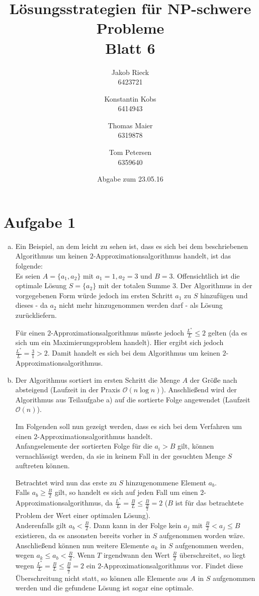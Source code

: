 \documentclass[12pt,a4paper]{article}
\title{Lösungsstrategien für NP-schwere Probleme\\Blatt 6}
\author{
		Jakob Rieck\\
		\small{6423721}
	\and
		Konstantin Kobs\\
		\small{6414943}
	\and
		Thomas Maier\\
		\small{6319878}
	\and
		Tom Petersen\\
		\small{6359640}
}
\date{Abgabe zum 23.05.16}
\begin{document}
\maketitle

\section*{Aufgabe 1}

 \begin{enumerate}[a)]

 	\item Ein Beispiel, an dem leicht zu sehen ist, dass es sich bei dem beschriebenen Algorithmus um keinen \(2\)-Approximationsalgorithmus handelt, ist das folgende:\\	
 	 Es seien \(A = \{a_1, a_2\}\) mit \(a_1 = 1, a_2 = 3\) und \(B = 3\). Offensichtlich ist die optimale Lösung \(S = \{a_2\}\) mit der totalen Summe \(3\). Der Algorithmus in der vorgegebenen Form würde jedoch im ersten Schritt \(a_1\) zu \(S\) hinzufügen und dieses - da \(a_2\) nicht mehr hinzugenommen werden darf - als Lösung zurückliefern. 
 	 
 	 Für einen \(2\)-Approximationsalgorithmus müsste jedoch \(\frac{L^*}{L} \le 2\) gelten (da es sich um ein Maximierungsproblem handelt). Hier ergibt sich jedoch \(\frac{L^*}{L} = \frac{3}{1} > 2\). Damit handelt es sich bei dem Algorithmus um keinen \(2\)-Approximationsalgorithmus.
 	
 	\item Der Algorithmus sortiert im ersten Schritt die Menge \(A\) der Größe nach absteigend (Laufzeit in der Praxis \(\mathcal{O}(n \log n)\)). Anschließend wird der Algorithmus aus Teilaufgabe a) auf die sortierte Folge angewendet (Laufzeit \(\mathcal{O}(n)\)).
 	
 	Im Folgenden soll nun gezeigt werden, dass es sich bei dem Verfahren um einen \(2\)-Approximationsalgorithmus handelt.\\
 	Anfangselemente der sortierten Folge für die \(a_i > B\) gilt, können vernachlässigt werden, da sie in keinem Fall in der gesuchten Menge \(S\) auftreten können. 
 	
 	Betrachtet wird nun das erste zu \(S\) hinzugenommene Element \(a_b\).\\
 	Falls \(a_b \ge \frac{B}{2}\) gilt, so handelt es sich auf jeden Fall um einen \(2\)-Appro\-xi\-ma\-tions\-algorithmus, da \(\frac{L^*}{L} = \frac{B}{L} \le \frac{B}{\frac{B}{2}} = 2\) (\(B\) ist für das betrachtete Problem der Wert einer optimalen Lösung).\\
 	Anderenfalls gilt \(a_b < \frac{B}{2}\). Dann kann in der Folge kein \(a_j\) mit \(\frac{B}{2} < a_j \le B\) existieren, da es ansonsten bereits vorher in \(S\) aufgenommen worden wäre. Anschließend können nun weitere Elemente \(a_k\) in \(S\) aufgenommen werden, wegen \(a_k \le a_b < \frac{B}{2}\). Wenn \(T\) irgendwann den Wert \(\frac{B}{2}\) überschreitet, so liegt wegen \(\frac{L^*}{L} = \frac{B}{L} \le \frac{B}{\frac{B}{2}} = 2\) ein \(2\)-Appro\-xi\-ma\-tions\-algorithmus vor. Findet diese Überschreitung nicht statt, so können alle Elemente aus \(A\) in \(S\) aufgenommen werden und die gefundene Lösung ist sogar eine optimale. 
 	

\end{enumerate}
\end{document}
